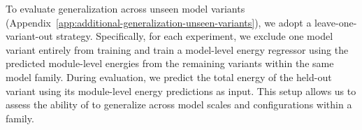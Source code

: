 





To evaluate generalization across unseen model variants (Appendix~\ref{app:additional-generalization-unseen-variants}), we adopt a leave-one-variant-out strategy. Specifically, for each experiment, we exclude one model variant entirely from training and train a model-level energy regressor using the predicted module-level energies from the remaining variants within the same model family. During evaluation, we predict the total energy of the held-out variant using its module-level energy predictions as input. This setup allows us to assess the ability of \sys{} to generalize across model scales and configurations within a family.





